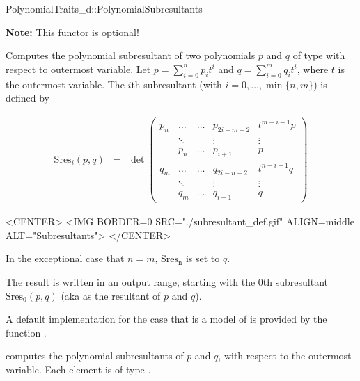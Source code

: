 \begin{ccRefConcept}{PolynomialTraits_d::PolynomialSubresultants}

\textbf{Note:} This functor is optional!

\ccDefinition

Computes the polynomial subresultant of two polynomials $p$ and $q$ of 
type  with respect to outermost variable.
Let 
$p=\sum_{i=0}^{n} p_i t^i$ and 
$q=\sum_{i=0}^{m} q_i t^i$, where $t$
is the outermost variable.
The $i$th subresultant (with $i=0,\ldots,\min\{n,m\}$) is defined by

\begin{ccTexOnly}
\begin{eqnarray*}
\mathrm{Sres}_i(p,q)&=&\det \left(\begin{array}{cccccc}
p_n & \ldots &\ldots& p_{2i-m+2}&t^{m-i-1}p \\
&\ddots&&\vdots&\vdots\\
&p_n&\ldots&p_{i+1}&p\\
q_m & \ldots &\ldots & q_{2i-n+2}&t^{n-i-1}q \\
&\ddots&&\vdots&\vdots\\
&q_m&\ldots&q_{i+1}&q
\end{array}\right)
\end{eqnarray*}
\end{ccTexOnly}

\begin{ccHtmlOnly}
<CENTER>
<IMG BORDER=0 SRC="./subresultant_def.gif" ALIGN=middle ALT="Subresultants">
</CENTER>
\end{ccHtmlOnly}

In the exceptional case that $n=m$, $\mathrm{Sres_n}$ is set to $q$.

The result is written in an output range, starting with the $0$th subresultant
$\mathrm{Sres}_0(p,q)$
(aka as the resultant of $p$ and $q$).

A default implementation for the case that 
is a model of 
is provided by the function .

\ccOperations
{}
         { computes the polynomial subresultants of $p$ and $q$, 
           with respect to the outermost variable. Each element is of type
           .}


\end{ccRefConcept}
